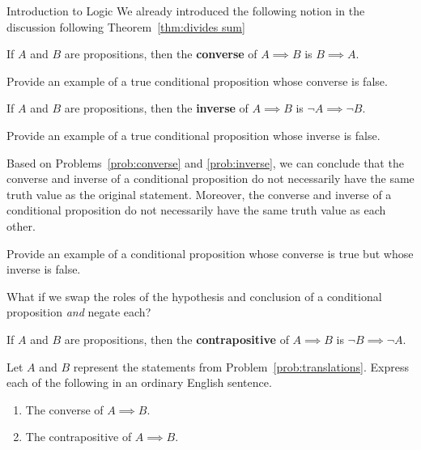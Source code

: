 \begin{section}{Introduction to Logic}
We already introduced the following notion in the discussion following Theorem~\ref{thm:divides sum}

\begin{definition}\label{def:converse}
If $A$ and $B$ are propositions, then the \textbf{converse} of $A \implies B$ is $B \implies A$.
\end{definition}

\begin{problem}\label{prob:converse}
Provide an example of a true conditional proposition whose converse is false.
\end{problem}

\begin{definition}\label{def:inverse}
If $A$ and $B$ are propositions, then the \textbf{inverse} of $A \implies B$ is $\neg A \implies \neg B$.
\end{definition}

\begin{problem}\label{prob:inverse}
Provide an example of a true conditional proposition whose inverse is false.
\end{problem}

Based on Problems~\ref{prob:converse} and \ref{prob:inverse}, we can conclude that the converse and inverse of a conditional proposition do not necessarily have the same truth value as the original statement.  Moreover, the converse and inverse of a conditional proposition do not necessarily have the same truth value as each other.

\begin{problem}\label{prob:converse and inverse}
Provide an example of a conditional proposition whose converse is true but whose inverse is false.
\end{problem}

What if we swap the roles of the hypothesis and conclusion of a conditional proposition \emph{and} negate each?

\begin{definition}
If $A$ and $B$ are propositions, then the \textbf{contrapositive} of $A \implies B$ is $\neg B \implies \neg A$.
\end{definition}

\begin{problem}
Let $A$ and $B$ represent the statements from Problem~\ref{prob:translations}.  Express each of the following in an ordinary English sentence.
\begin{enumerate}[label=\textrm{(\alph*)}]
\item The converse of $A \implies B$.
\item The contrapositive of $A \implies B$.
\end{enumerate}
\end{problem}


\end{section}
